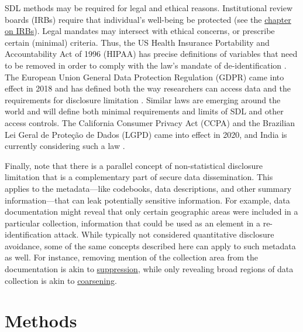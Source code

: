 SDL methods may be required for legal and ethical reasons. Institutional review boards (IRBs) require that individual's well-being be protected (see the \protect\hyperlink{irb}{chapter on IRBs}). Legal mandates may intersect with ethical concerns, or prescribe certain (minimal) criteria. Thus, the US Health Insurance Portability and Accountability Act of 1996 (HIPAA) \citep{us_department_of_health__human_services_health_nodate} has precise definitions of variables that need to be removed in order to comply with the law's mandate of de-identification \citep{department_of_health_and_human_services_methods_2012}. The European Union General Data Protection Regulation (GDPR) came into effect in 2018 and has defined both the way researchers can access data and the requirements for disclosure limitation \citep{cohen_towards_2020, greene_adjusting_2019, molnar-gabor_germany_2018}. Similar laws are emerging around the world and will define both minimal requirements and limits of SDL and other access controls. The California Consumer Privacy Act (CCPA) \citep{marini_comparing_2018} and the Brazilian Lei Geral de Proteção de Dados (LGPD) \citep{black_6_2020} came into effect in 2020, and India is currently considering such a law \citep{panakal_indias_2019}.

Finally, note that there is a parallel concept of non-statistical disclosure limitation that is a complementary part of secure data dissemination. This applies to the metadata---like codebooks, data descriptions, and other summary information---that can leak potentially sensitive information. For example, data documentation might reveal that only certain geographic areas were included in a particular collection, information that could be used as an element in a re-identification attack. While typically not considered quantitative disclosure avoidance, some of the same concepts described here can apply to such metadata as well. For instance, removing mention of the collection area from the documentation is akin to \protect\hyperlink{suppression}{suppression}, while only revealing broad regions of data collection is akin to \protect\hyperlink{coarsening}{coarsening}.

\hypertarget{methods}{%
\section{Methods}\label{methods}}

